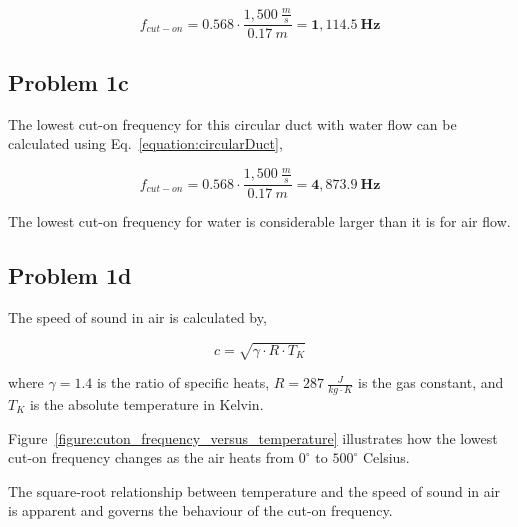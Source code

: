 \vspace{-0.25cm}
\begin{equation*}
    f_{cut-on} = 0.568 \cdot \frac{ 1,500~\frac{m}{s} }{ 0.17~m } = \boldsymbol{1,114.5~Hz}
\end{equation*}




\vspace{-0.25cm}
\subsection*{Problem 1c}

The lowest cut-on frequency for this circular duct with water flow can be calculated using Eq.~\ref{equation:circularDuct},

\vspace{-0.25cm}
\begin{equation*}
    f_{cut-on} = 0.568 \cdot \frac{ 1,500~\frac{m}{s} }{ 0.17~m } = \boldsymbol{4,873.9~Hz}
\end{equation*}

\vspace{0.25cm}
The lowest cut-on frequency for water is considerable larger than it is for air flow.





\vspace{-0.25cm}
\subsection*{Problem 1d}

The speed of sound in air is calculated by,

\vspace{-0.25cm}
\begin{equation}
    c = \sqrt{ \gamma \cdot R \cdot T_K }
    \label{equation:speedOfSoundInAir}
\end{equation}

where $\gamma = 1.4$ is the ratio of specific heats, $R = 287~\frac{J}{kg \cdot K}$ is the gas constant, and $T_K$ is the absolute temperature in Kelvin.

\vspace{0.25cm}
Figure~\ref{figure:cuton_frequency_versus_temperature} illustrates how the lowest cut-on frequency changes as the air heats from $0^{\circ}$ to $500^{\circ}$ Celsius.

\vspace{0.25cm}
The square-root relationship between temperature and the speed of sound in air is apparent and governs the behaviour of the cut-on frequency.




